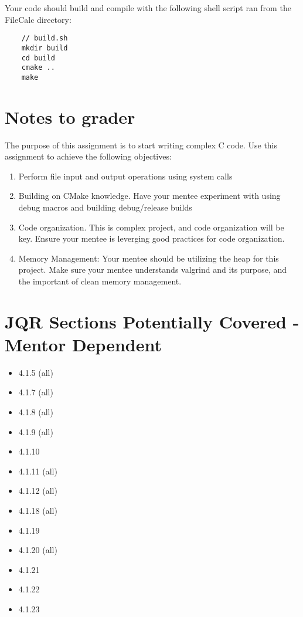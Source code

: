 \documentclass[letterpaper,12pt]{article}
\begin{document}
	Your code should build and compile with the following shell script ran from the FileCalc directory:

	\begin{lstlisting}
	// build.sh
	mkdir build
	cd build
	cmake .. 
	make
	\end{lstlisting}
	
	
	\section{Notes to grader}
	The purpose of this assignment is to start writing complex C code. Use this assignment to achieve the following objectives:
	\begin{enumerate}
		\item Perform file input and output operations using system calls
		\item Building on CMake knowledge. Have your mentee experiment with using debug macros and building debug/release builds
		\item Code organization. This is complex project, and code organization will be key. Ensure your mentee is leverging good practices for code organization.
		\item Memory Management: Your mentee should be utilizing the heap for this project. Make sure your mentee understands valgrind and its purpose, and the important of clean memory management. 
	\end{enumerate}

	\section{JQR Sections Potentially Covered - Mentor Dependent}
	\begin{itemize}
		\item 4.1.5 (all)
		\item 4.1.7 (all)
		\item 4.1.8 (all)
		\item 4.1.9 (all)
		\item 4.1.10
		\item 4.1.11 (all)
		\item 4.1.12 (all)
		\item 4.1.18 (all)
		\item 4.1.19
		\item 4.1.20 (all)
		\item 4.1.21
		\item 4.1.22
		\item 4.1.23
	\end{itemize}
	
	
\end{document}

